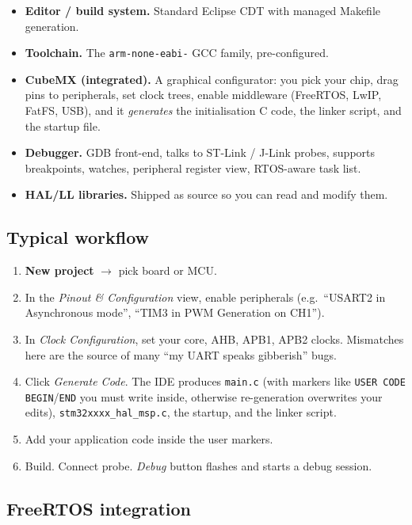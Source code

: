 \documentclass[11pt,a4paper]{article}
\begin{document}
\begin{itemize}[leftmargin=*]
    \item \textbf{Editor / build system.} Standard Eclipse CDT with managed
    Makefile generation.
    \item \textbf{Toolchain.} The \texttt{arm-none-eabi-} GCC family,
    pre-configured.
    \item \textbf{CubeMX (integrated).} A graphical configurator: you pick
    your chip, drag pins to peripherals, set clock trees, enable middleware
    (FreeRTOS, LwIP, FatFS, USB), and it \emph{generates} the initialisation
    C code, the linker script, and the startup file.
    \item \textbf{Debugger.} GDB front-end, talks to ST-Link / J-Link probes,
    supports breakpoints, watches, peripheral register view, RTOS-aware
    task list.
    \item \textbf{HAL/LL libraries.} Shipped as source so you can read and
    modify them.
\end{itemize}

\subsection{Typical workflow}

\begin{enumerate}[leftmargin=*]
    \item \textbf{New project} $\rightarrow$ pick board or MCU.
    \item In the \emph{Pinout \& Configuration} view, enable peripherals
    (e.g.\ ``USART2 in Asynchronous mode'', ``TIM3 in PWM Generation on CH1'').
    \item In \emph{Clock Configuration}, set your core, AHB, APB1, APB2
    clocks. Mismatches here are the source of many ``my UART speaks
    gibberish'' bugs.
    \item Click \emph{Generate Code}. The IDE produces \texttt{main.c}
    (with markers like \texttt{USER CODE BEGIN}/\texttt{END} you must
    write inside, otherwise re-generation overwrites your edits),
    \texttt{stm32xxxx\_hal\_msp.c}, the startup, and the linker script.
    \item Add your application code inside the user markers.
    \item Build. Connect probe. \emph{Debug} button flashes and starts
    a debug session.
\end{enumerate}

\subsection{FreeRTOS integration}
\end{document}
